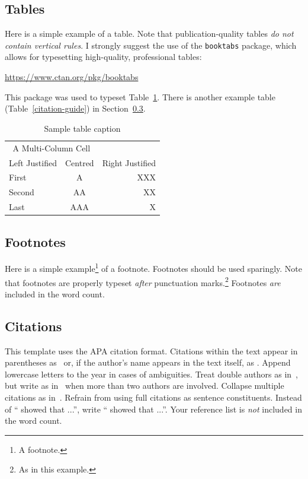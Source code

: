 \documentclass[12pt,a4paper]{article}
\begin{document}
\subsection{Tables}

Here is a simple example of a table. Note that publication-quality tables
\textit{do not contain vertical rules}. I strongly suggest the use of the
\texttt{booktabs} package, which allows for typesetting high-quality,
professional tables:

\url{https://www.ctan.org/pkg/booktabs}

\noindent
This package was used to typeset Table~\ref{table:sample-table}. There is another
example table (Table~\ref{citation-guide}) in Section~\ref{sec:citations}.

\begin{table}[h]
    \centering
    \begin{tabular}{lcr}
        \toprule
        \multicolumn{2}{c}{A Multi-Column Cell} &  \\
        \cmidrule(r){1-2}
        Left Justified & Centred & Right Justified \\
        \midrule
        First          & A       & XXX             \\
        Second         & AA      & XX              \\
        Last           & AAA     & X               \\
        \bottomrule
    \end{tabular}
    \caption{Sample table caption}
    \label{table:sample-table}
\end{table}

\subsection{Footnotes}

Here is a simple example\footnote{A footnote.} of a footnote. Footnotes should
be used sparingly. Note that footnotes are properly typeset \textit{after}
punctuation marks.\footnote{As in this example.} Footnotes \textit{are} included
in the word count.

\subsection{Citations} \label{sec:citations}

This template uses the APA citation format. Citations within the text appear in 
parentheses as~\citep{Chang14} or, if the author's name appears in the text
itself, as \citet{Chang14}. Append lowercase letters to the year in cases of
ambiguities. Treat double authors as in~\citep{Mankiw14}, but write as
in~\citep{Floud14} when more than two authors are
involved. Collapse multiple citations as
in~\citep{Mankiw14,Floud14}. Refrain from using full citations as sentence
constituents. Instead of ``\citep{Chang14} showed that ...'', write
``\citet{Chang14} showed that ...''. Your reference list is \textit{not}
included in the word count.
\end{document}
